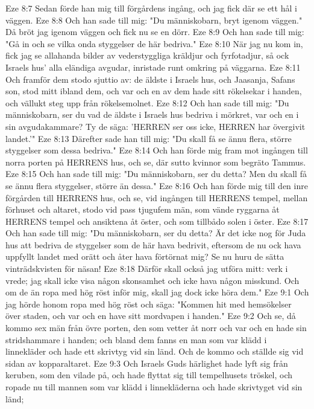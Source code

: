 Eze 8:7  Sedan förde han mig till förgårdens ingång, och jag fick där se ett hål i väggen.
Eze 8:8  Och han sade till mig: "Du människobarn, bryt igenom väggen." Då bröt jag igenom väggen och fick nu se en dörr.
Eze 8:9  Och han sade till mig: "Gå in och se vilka onda styggelser de här bedriva."
Eze 8:10  När jag nu kom in, fick jag se allahanda bilder av vederstyggliga kräldjur och fyrfotadjur, så ock Israels hus' alla eländiga avgudar, inristade runt omkring på väggarna.
Eze 8:11  Och framför dem stodo sjuttio av: de äldste i Israels hus, och Jaasanja, Safans son, stod mitt ibland dem, och var och en av dem hade sitt rökelsekar i handen, och vällukt steg upp från rökelsemolnet.
Eze 8:12  Och han sade till mig: "Du människobarn, ser du vad de äldste i Israels hus bedriva i mörkret, var och en i sin avgudakammare? Ty de säga: 'HERREN ser oss icke, HERREN har övergivit landet.'"
Eze 8:13  Därefter sade han till mig: "Du skall få se ännu flera, större styggelser som dessa bedriva."
Eze 8:14  Och han förde mig fram mot ingången till norra porten på HERRENS hus, och se, där sutto kvinnor som begräto Tammus.
Eze 8:15  Och han sade till mig: "Du människobarn, ser du detta? Men du skall få se ännu flera styggelser, större än dessa."
Eze 8:16  Och han förde mig till den inre förgården till HERRENS hus, och se, vid ingången till HERRENS tempel, mellan förhuset och altaret, stodo vid pass tjugufem män, som vände ryggarna åt HERRENS tempel och ansiktena åt öster, och som tillbådo solen i öster.
Eze 8:17  Och han sade till mig: "Du människobarn, ser du detta? Är det icke nog för Juda hus att bedriva de styggelser som de här hava bedrivit, eftersom de nu ock hava uppfyllt landet med orätt och åter hava förtörnat mig? Se nu huru de sätta vinträdskvisten för näsan!
Eze 8:18  Därför skall också jag utföra mitt: verk i vrede; jag skall icke visa någon skonsamhet och icke hava någon misskund. Och om de än ropa med hög röst inför mig, skall jag dock icke höra dem."
Eze 9:1  Och jag hörde honom ropa med hög röst och säga: "Kommen hit med hemsökelser över staden, och var och en have sitt mordvapen i handen."
Eze 9:2  Och se, då kommo sex män från övre porten, den som vetter åt norr och var och en hade sin stridshammare i handen; och bland dem fanns en man som var klädd i linnekläder och hade ett skrivtyg vid sin länd. Och de kommo och ställde sig vid sidan av kopparaltaret.
Eze 9:3  Och Israels Guds härlighet hade lyft sig från keruben, som den vilade på, och hade flyttat sig till tempelhusets tröskel, och ropade nu till mannen som var klädd i linnekläderna och hade skrivtyget vid sin länd;
